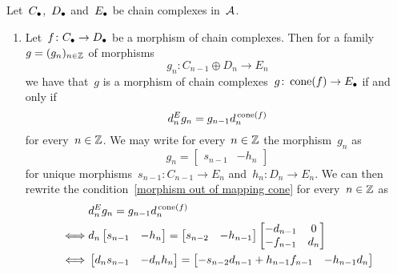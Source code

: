 \begin{remark*}
  Let~$C_\bullet$,~$D_\bullet$ and~$E_\bullet$ be chain complexes in~$\mathcal{A}$.
  \begin{enumerate}
    \item
      Let~$f \colon C_\bullet \to D_\bullet$ be a morphism of chain complexes.
      Then for a family~$g = (g_n)_{n \in \mathbb{Z}}$ of morphisms
      \[
        g_n
        \colon
        C_{n-1} \oplus D_n
        \to
        E_n
      \]
      we have that~$g$ is a morphism of chain complexes~$g \colon \operatorname{cone}(f) \to E_\bullet$ if and only if
      \begin{equation}
        \label{morphism out of mapping cone}
          d^E_n g_n
        = g_{n-1} d^{\,\operatorname{cone}(f)}_n
      \end{equation}
      for every~$n \in \mathbb{Z}$.
      We may write for every~$n \in \mathbb{Z}$ the morphism~$g_n$ as
      \[
          g_n
        = \begin{bmatrix}
            s_{n-1} & -h_n
          \end{bmatrix}
      \]
      for unique morphisms~$s_{n-1} \colon C_{n-1} \to E_n$ and~$h_n \colon D_n \to E_n$.
      We can then rewrite the condition~\eqref{morphism out of mapping cone} for every~$n \in \mathbb{Z}$ as
      \begin{align*}
            &{}   d^E_n g_n
                = g_{n-1} d^{\,\cone(f)}_n  \\
        \iff&{}   d_n
                  \begin{bmatrix}
                    s_{n-1} & -h_n
                  \end{bmatrix}
                =
                  \begin{bmatrix}
                    s_{n-2} & -h_{n-1}
                  \end{bmatrix}
                  \begin{bmatrix}
                    -d_{n-1}  & 0   \\
                    -f_{n-1}  & d_n
                  \end{bmatrix} \\
        \iff&{}   \begin{bmatrix}
                    d_n s_{n-1} & -d_n h_n
                  \end{bmatrix}
                  =
                  \begin{bmatrix}
                    - s_{n-2} d_{n-1} + h_{n-1} f_{n-1} & -h_{n-1} d_n
                  \end{bmatrix} \\

\end{align*}
\end{enumerate}
\end{remark*}
